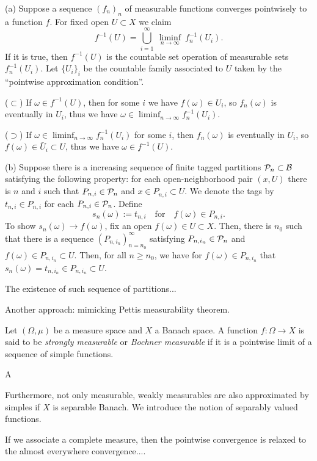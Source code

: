 \documentclass[12pt]{article}
\begin{document}
\begin{pf}
(a)
Suppose a sequence $(f_n)_n$ of measurable functions converges pointwisely to a function $f$.
For fixed open $U\subset X$ we claim
\[f^{-1}(U)=\bigcup_{i=1}^\infty\ \liminf_{n\to\infty}\ f_n^{-1}(U_i).\]
If it is true, then $f^{-1}(U)$ is the countable set operation of measurable sets $f_n^{-1}(U_i)$.
Let $\{U_i\}_i$ be the countable family associated to $U$ taken by the ``pointwise approximation condition''.

($\subset$) If $\omega\in f^{-1}(U)$, then for some $i$ we have $f(\omega)\in U_i$, so $f_n(\omega)$ is eventually in $U_i$, thus we have $\omega\in\liminf_{n\to\infty}f_n^{-1}(U_i)$.

($\supset$) If $\omega\in\liminf_{n\to\infty}f_n^{-1}(U_i)$ for some $i$, then $f_n(\omega)$ is eventually in $U_i$, so $f(\omega)\in\bar U_i\subset U$, thus we have $\omega\in f^{-1}(U)$.

(b)
Suppose there is a increasing sequence of finite tagged partitions $\mathcal{P}_n\subset\mathcal{B}$ satisfying the following property: for each open-neighborhood pair $(x,U)$ there is $n$ and $i$ such that $P_{n,i}\in\mathcal{P}_n$ and $x\in P_{n,i}\subset U$.
We denote the tags by $t_{n,i}\in P_{n,i}$ for each $P_{n,i}\in\mathcal{P}_n$.
Define
\[s_n(\omega):=t_{n,i}\quad\text{for}\quad f(\omega)\in P_{n,i}.\]
To show $s_n(\omega)\to f(\omega)$, fix an open $f(\omega)\in U\subset X$.
Then, there is $n_0$ such that there is a sequence $(P_{n,i_n})_{n=n_0}^\infty$ satisfying $P_{n,i_n}\in\mathcal{P}_n$ and $f(\omega)\in P_{n,i_n}\subset U$.
Then, for all $n\ge n_0$, we have for $f(\omega)\in P_{n,i_n}$ that $s_n(\omega)=t_{n,i_n}\in P_{n,i_n}\subset U$.

The existence of such sequence of partitions...

Another approach: mimicking Pettis measurability theorem.

\end{pf}

\begin{prb}
Let $(\Omega,\mu)$ be a measure space and $X$ a Banach space.
A function $f:\Omega\to X$ is said to be \emph{strongly measurable} or \emph{Bochner measurable} if it is a pointwise limit of a sequence of simple functions.

\begin{parts}
\item A
\end{parts}
\end{prb}


\begin{prb}
Furthermore, not only measurable, weakly measurables are also approximated by simples if $X$ is separable Banach.
We introduce the notion of separably valued functions.

If we associate a complete measure, then the pointwise convergence is relaxed to the almost everywhere convergence....
\end{prb}
\end{document}
